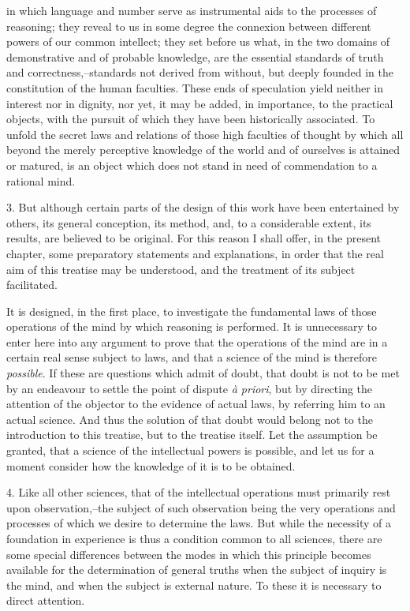 \documentclass[oneside]{book}
\begin{document}
in which language and number serve as instrumental aids to the
processes of reasoning; they reveal to us in some degree the
connexion between different powers of our common intellect;
they set before us what, in the two domains of demonstrative and
of probable knowledge, are the essential standards of truth and
correctness,--standards not derived from without, but deeply
founded in the constitution of the human faculties. These ends
of speculation yield neither in interest nor in dignity, nor yet, it
may be added, in importance, to the practical objects, with the
pursuit of which they have been historically associated. To unfold
the secret laws and relations of those high faculties of
thought by which all beyond the merely perceptive knowledge
of the world and of ourselves is attained or matured, is an object
which does not stand in need of commendation to a rational
mind.

3. But although certain parts of the design of this work have
been entertained by others, its general conception, its method,
and, to a considerable extent, its results, are believed to be original.
For this reason I shall offer, in the present chapter, some
preparatory statements and explanations, in order that the real
aim of this treatise may be understood, and the treatment of its
subject facilitated.

It is designed, in the first place, to investigate the fundamental
laws of those operations of the mind by which reasoning is
performed. It is unnecessary to enter here into any argument to
prove that the operations of the mind are in a certain real sense
subject to laws, and that a science of the mind is therefore {\it possible}.
If these are questions which admit of doubt, that doubt is not
to be met by an endeavour to settle the point of dispute \textit{\`{a} priori},
but by directing the attention of the objector to the evidence of
actual laws, by referring him to an actual science. And thus the
solution of that doubt would belong not to the introduction to
this treatise, but to the treatise itself. Let the assumption be
granted, that a science of the intellectual powers is possible, and
let us for a moment consider how the knowledge of it is to be
obtained.

4. Like all other sciences, that of the intellectual operations
must primarily rest upon observation,--the subject of such observation
being the very operations and processes of which we
desire to determine the laws. But while the necessity of a foundation
in experience is thus a condition common to all sciences,
there are some special differences between the modes in which
this principle becomes available for the determination of general
truths when the subject of inquiry is the mind, and when the
subject is external nature. To these it is necessary to direct
attention.
\end{document}
